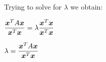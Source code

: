 Trying to solve for $\lambda$ we obtain:
\begin{center}
	$\displaystyle \frac{\bm{x}^TA\bm{x}}{\bm{x}^T\bm{x}}=\lambda\frac{\bm{x}^T\bm{x}}{\bm{x}^T\bm{x}}$
\end{center}
\begin{definition}
\begin{center}
	$\displaystyle \lambda=\frac{\bm{x}^TA\bm{x}}{\bm{x}^T\bm{x}}$
\end{center}
\end{definition}
























